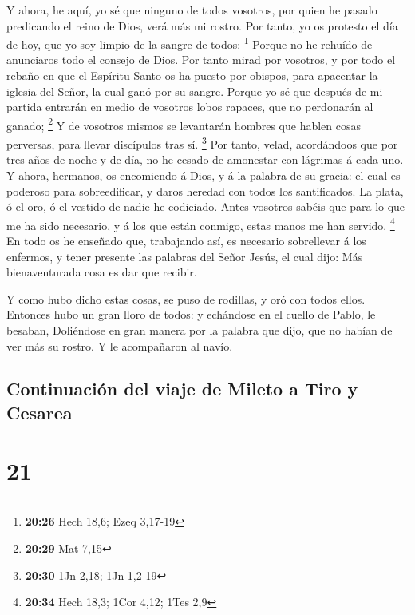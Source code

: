  Y ahora, he aquí, yo sé que ninguno de todos vosotros,
por quien he pasado predicando el reino de Dios, verá más mi rostro.
 Por tanto, yo os protesto el día de hoy, que yo soy
limpio de la sangre de todos: \footnote{\textbf{20:26} Hech 18,6; Ezeq
  3,17-19}  Porque no he rehuído de anunciaros todo el
consejo de Dios.  Por tanto mirad por vosotros, y por
todo el rebaño en que el Espíritu Santo os ha puesto por obispos, para
apacentar la iglesia del Señor, la cual ganó por su sangre.
 Porque yo sé que después de mi partida entrarán en medio
de vosotros lobos rapaces, que no perdonarán al ganado; \footnote{\textbf{20:29}
  Mat 7,15}  Y de vosotros mismos se levantarán hombres
que hablen cosas perversas, para llevar discípulos tras sí. \footnote{\textbf{20:30}
  1Jn 2,18; 1Jn 1,2-19}  Por tanto, velad, acordándoos
que por tres años de noche y de día, no he cesado de amonestar con
lágrimas á cada uno.  Y ahora, hermanos, os encomiendo á
Dios, y á la palabra de su gracia: el cual es poderoso para
sobreedificar, y daros heredad con todos los santificados.
 La plata, ó el oro, ó el vestido de nadie he codiciado.
 Antes vosotros sabéis que para lo que me ha sido
necesario, y á los que están conmigo, estas manos me han servido.
\footnote{\textbf{20:34} Hech 18,3; 1Cor 4,12; 1Tes 2,9} 
En todo os he enseñado que, trabajando así, es necesario sobrellevar á
los enfermos, y tener presente las palabras del Señor Jesús, el cual
dijo: Más bienaventurada cosa es dar que recibir.

 Y como hubo dicho estas cosas, se puso de rodillas, y
oró con todos ellos.  Entonces hubo un gran lloro de
todos: y echándose en el cuello de Pablo, le besaban, 
Doliéndose en gran manera por la palabra que dijo, que no habían de ver
más su rostro. Y le acompañaron al navío.

\hypertarget{continuaciuxf3n-del-viaje-de-mileto-a-tiro-y-cesarea}{%
\subsection{Continuación del viaje de Mileto a Tiro y
Cesarea}\label{continuaciuxf3n-del-viaje-de-mileto-a-tiro-y-cesarea}}

\hypertarget{section-20}{%
\section{21}\label{section-20}}

